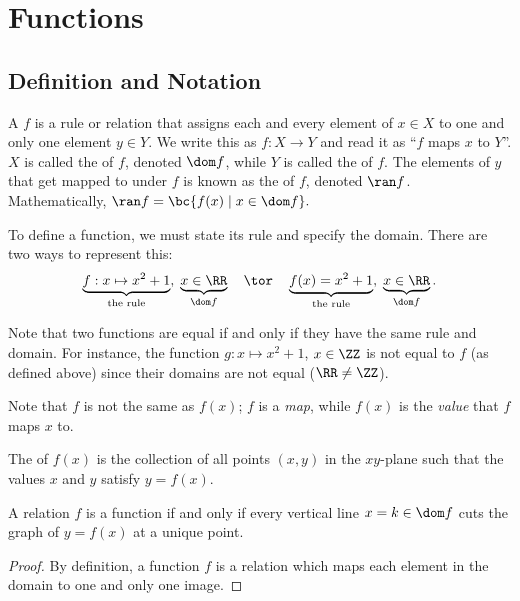 \chapter{Functions}\label{chap:Functions}

\section{Definition and Notation}

\begin{definition}
    A  $f$ is a rule or relation that assigns each and every element of $x \in X$ to one and only one element $y \in Y$. We write this as $f : X \to Y$ and read it as ``$f$ maps $x$ to $Y$''. $X$ is called the  of $f$, denoted $\dom f$, while $Y$ is called the  of $f$. The elements of $y$ that get mapped to under $f$ is known as the  of $f$, denoted $\ran f$. Mathematically, $\ran f = \bc{f(x) \mid x \in \dom f}.$
\end{definition}

To define a function, we must state its rule and specify the domain. There are two ways to represent this: \[\underbrace{f : x \mapsto x^2 + 1}_{\text{the rule}}, \; \underbrace{x \in \RR}_{\dom f} \quad \tor \quad \underbrace{f(x) = x^2 + 1}_{\text{the rule}}, \; \underbrace{x \in \RR}_{\dom f}.\]

Note that two functions are equal if and only if they have the same rule and domain. For instance, the function $g : x \mapsto x^2 + 1$, $x \in \ZZ$ is not equal to $f$ (as defined above) since their domains are not equal ($\RR \neq \ZZ$).

Note that $f$ is not the same as $f(x)$; $f$ is a \emph{map}, while $f(x)$ is the \emph{value} that $f$ maps $x$ to.

\begin{definition}\label{def:function-graph}
    The  of $f(x)$ is the collection of all points $(x, y)$ in the $xy$-plane such that the values $x$ and $y$ satisfy $y = f(x)$.
\end{definition}

\begin{proposition}
    A relation $f$ is a function if and only if every vertical line $x = k \in \dom f$ cuts the graph of $y = f(x)$ at a unique point.
\end{proposition}
\begin{proof}
    By definition, a function $f$ is a relation which maps each element in the domain to one and only one image.
\end{proof}

